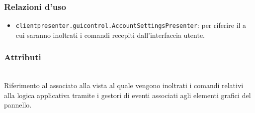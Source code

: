 \subsubsection*{Relazioni d'uso}
\begin{itemize}
  \item \texttt{clientpresenter.guicontrol.AccountSettingsPresenter}: per riferire il  a cui saranno inoltrati i comandi recepiti dall'interfaccia utente.
\end{itemize}

\subsubsection*{Attributi}
\begin{description}
  \item{}\\
  Riferimento al  associato alla vista al quale vengono inoltrati i comandi relativi alla logica applicativa tramite i gestori di eventi associati agli elementi grafici del pannello.
\end{description}

